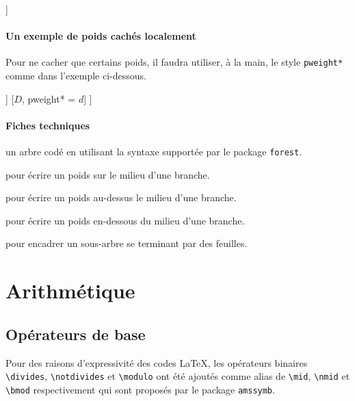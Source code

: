 \documentclass[12pt,a4paper]{article}
\theoremstyle{definition}
\begin{document}
\begin{tcblisting}{}
\begin{probatree*}
[$A$, pweight = $a$
    [$B$, pweight = $b$]
    [$C$, pweight = $c$]
]
\end{probatree*}
\end{tcblisting}


\paragraph{Un exemple de poids cachés localement}

Pour ne cacher que certains poids, il faudra utiliser, à la main, le style \verb+pweight*+ comme dans l'exemple ci-dessous.

\begin{tcblisting}{}
\begin{probatree}
[
    [$A$, pweight = $a$
        [$B$, pweight* = $b$]
        [$C$, pweight = $c$]
    ]
    [$D$, pweight* = $d$]
]
\end{probatree}
\end{tcblisting}


\paragraph{Fiches techniques}



\Content{} un arbre codé en utilisant la syntaxe supportée par le package \verb+forest+.

 pour écrire un poids sur le milieu d'une branche.

 pour écrire un poids au-dessus le milieu d'une branche.

 pour écrire un poids en-dessous du milieu d'une branche.

 pour encadrer un sous-arbre se terminant par des feuilles.




\section{Arithmétique}

\subsection{Opérateurs de base}

Pour des raisons d'expressivité des codes \LaTeX{}, les opérateurs binaires \verb+\divides+, \verb+\notdivides+ et \verb+\modulo+ ont été ajoutés comme alias de \verb+\mid+, \verb+\nmid+ et \verb+\bmod+ respectivement qui sont proposés par le package \verb+amssymb+.
\end{document}
